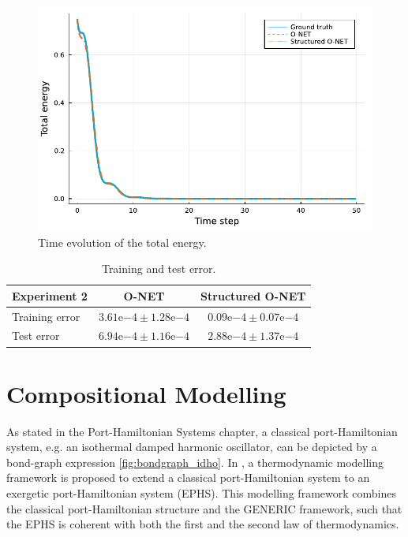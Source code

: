 \documentclass[
	parskip, 			   %
	twoside, 			   %
	DIV=14, 			   %
	BCOR=15.0mm, 		   %
	headsepline, 		   %
	open=right, 		   %
	captions=tableheading, %
	bibliography=totoc,    %
	numbers=noenddot       %
]{scrreprt}
\begin{document}
\begin{figure}[h!]
    \centering
    \includegraphics[scale=1]{figures/Hamiltonian_structured_O_NET_idho.pdf}
    \caption{Time evolution of the total energy.}
    \label{fig:Hamiltonian_error_structured_O_NET_idho}
\end{figure}

\begin{table}[h!]
	\centering
	\caption{Training and test error.}
	\label{tab:error_experiment2}
	\begin{tabularx}{\textwidth}{lcc}
		\toprule
		\textbf{Experiment 2} & \textbf{O-NET} & \textbf{Structured O-NET}\\
		\midrule
		Training error & $3.61\mathrm{e}{-4} \pm 1.28\mathrm{e}{-4}$ & $0.09\mathrm{e}{-4} \pm 0.07\mathrm{e}{-4}$ \\
		Test error & $6.94\mathrm{e}{-4} \pm 1.16\mathrm{e}{-4}$ & $2.88\mathrm{e}{-4} \pm 1.37\mathrm{e}{-4}$ \\
		\bottomrule
	\end{tabularx}
\end{table}

\clearpage
\chapter{Compositional Modelling}
\label{ch:chapter7}

As stated in the Port-Hamiltonian Systems chapter, a classical port-Hamiltonian system, e.g. an isothermal damped harmonic oscillator, can be depicted by a bond-graph expression \ref{fig:bondgraph_idho}. In \cite{lohmayer2021exergetic}, a thermodynamic modelling framework is proposed to extend a classical port-Hamiltonian system to an exergetic port-Hamiltonian system (EPHS). This modelling framework combines the classical port-Hamiltonian structure and the GENERIC framework, such that the EPHS is coherent with both the first and the second law of thermodynamics.
\end{document}
